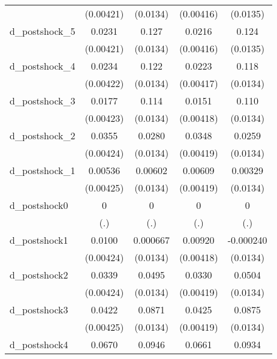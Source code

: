 {\begin{tabular}{l*{4}{c}}
          &(0.00421)         & (0.0134)         &(0.00416)         & (0.0135)         \\
d\_postshock\_5&   0.0231\sym{***}&    0.127\sym{***}&   0.0216\sym{***}&    0.124\sym{***}\\
          &(0.00421)         & (0.0134)         &(0.00416)         & (0.0135)         \\
d\_postshock\_4&   0.0234\sym{***}&    0.122\sym{***}&   0.0223\sym{***}&    0.118\sym{***}\\
          &(0.00422)         & (0.0134)         &(0.00417)         & (0.0134)         \\
d\_postshock\_3&   0.0177\sym{***}&    0.114\sym{***}&   0.0151\sym{***}&    0.110\sym{***}\\
          &(0.00423)         & (0.0134)         &(0.00418)         & (0.0134)         \\
d\_postshock\_2&   0.0355\sym{***}&   0.0280\sym{*}  &   0.0348\sym{***}&   0.0259         \\
          &(0.00424)         & (0.0134)         &(0.00419)         & (0.0134)         \\
d\_postshock\_1&  0.00536         &  0.00602         &  0.00609         &  0.00329         \\
          &(0.00425)         & (0.0134)         &(0.00419)         & (0.0134)         \\
d\_postshock0&        0         &        0         &        0         &        0         \\
          &      (.)         &      (.)         &      (.)         &      (.)         \\
d\_postshock1&   0.0100\sym{*}  & 0.000667         &  0.00920\sym{*}  &-0.000240         \\
          &(0.00424)         & (0.0134)         &(0.00418)         & (0.0134)         \\
d\_postshock2&   0.0339\sym{***}&   0.0495\sym{***}&   0.0330\sym{***}&   0.0504\sym{***}\\
          &(0.00424)         & (0.0134)         &(0.00419)         & (0.0134)         \\
d\_postshock3&   0.0422\sym{***}&   0.0871\sym{***}&   0.0425\sym{***}&   0.0875\sym{***}\\
          &(0.00425)         & (0.0134)         &(0.00419)         & (0.0134)         \\
d\_postshock4&   0.0670\sym{***}&   0.0946\sym{***}&   0.0661\sym{***}&   0.0934\sym{***}\\

\end{tabular}}
